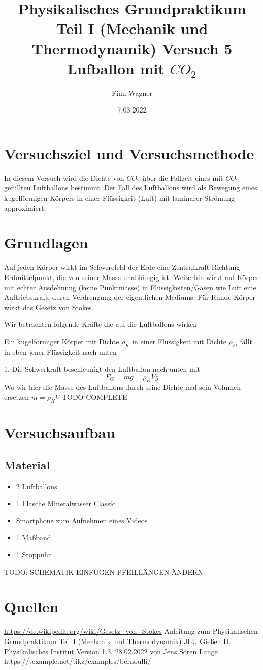 \documentclass{article}
\date{7.03.2022}
\title{Physikalisches Grundpraktikum Teil I (Mechanik und Thermodynamik) Versuch 5 Lufballon mit \(CO_2\)}
\author{Finn Wagner}
\begin{document}
    \maketitle

    \section{Versuchsziel und Versuchsmethode}
    In diesem Versuch wird die Dichte von \(CO_2\) über die Fallzeit eines mit \(CO_2\) gefüllten Luftballons bestimmt.
    Der Fall des Luftballons wird als Bewegung eines kugelförmigen Körpers in einer Flüssigkeit (Luft) mit laminarer Strömung approximiert.

    \section{Grundlagen}
    Auf jeden Körper wirkt im Schwerefeld der Erde eine Zentralkraft Richtung Erdmittelpunkt, die von seiner Masse unabhängig ist.
    Weiterhin wirkt auf Körper mit echter Ausdehnung (keine Punktmasse) in Flüssigkeiten/Gasen wie Luft eine Auftriebskraft, 
    durch Verdrengung der eigentlichen Mediums.
    Für Runde Körper wirkt das Gesetz von Stokes.

    Wir betrachten folgende Kräfte die auf die Luftballons wirken

    Ein kugelförmiger Körper mit Dichte \(\rho_K\) in einer Flüssigkeit mit Dichte \(\rho_{Fl}\) fällt in eben jener Flüssigkeit nach unten

    1. Die Schwerkraft beschleunigt den Luftballon nach unten mit
    \[ F_G = mg = \rho_K V g \]
    Wo wir hier die Masse des Luftballons durch seine Dichte mal sein Volumen ersetzen \( m = \rho_K V \)
    TODO COMPLETE

    \section{Versuchsaufbau}
        \subsection{Material}
        \begin{itemize}
            \item 2 Luftballons
            \item 1 Flasche Mineralwasser Classic
            \item Smartphone zum Aufnehmen eines Videos
            \item 1 Maßband
            \item 1 Stoppuhr
        \end{itemize}

    TODO: SCHEMATIK EINFÜGEN PFEILLÄNGEN ÄNDERN


    \section{Quellen}
    \url{https://de.wikipedia.org/wiki/Gesetz_von_Stokes}
    Anleitung zum Physikalischen Grundpraktikum Teil I (Mechanik und Thermodynamik) JLU Gießen II. Physikalisches Institut Version 1.3, 28.02.2022 von Jens Sören Lange
    https://texample.net/tikz/examples/bernoulli/
\end{document}
